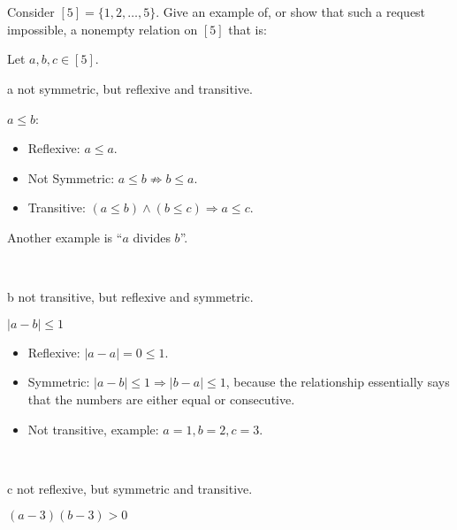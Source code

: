 \documentclass{article}
\begin{document}
\section{}

\begin{problem*}
Consider $[5]=\{1,2,\dots,5\}$. Give an example of, or show that such a request impossible, a nonempty relation on $[5]$ that is:
\end{problem*}

Let $a,b,c \in [5]$.

\begin{problem} a
not symmetric, but reflexive and transitive.
\end{problem}

$a \leq b$:
\begin{itemize}
\item Reflexive: $ a\leq a$.
\item Not Symmetric: $ a\leq b\not \Rightarrow b\leq a$.
\item Transitive: $ (a\leq b)\land (b\leq c)\Rightarrow a\leq c$.
\end{itemize}

Another example is ``$a$ divides $b$''.

\

\begin{problem} b
not transitive, but reflexive and symmetric.
\end{problem}

$|a-b|\leq 1$
\begin{itemize}
\item Reflexive: $|a-a|=0\leq 1$.
\item Symmetric: $|a-b|\leq 1\Rightarrow |b-a|\leq 1$, because the relationship essentially says that the numbers are either equal or consecutive.
\item Not transitive, example: $a=1,b=2,c=3$.
\end{itemize}

\

\begin{problem} c
not reflexive, but symmetric and transitive.
\end{problem}

$( a-3)( b-3)  >0$
\end{document}
